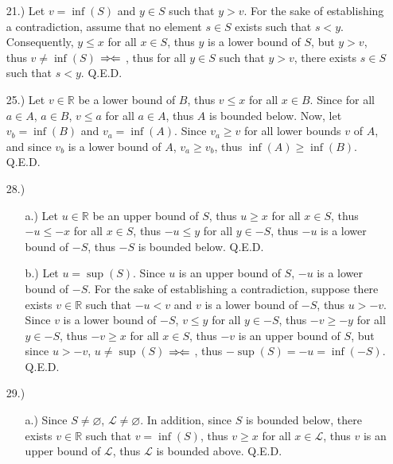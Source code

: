 \documentclass[12pt]{article}
\newcommand{\contradiction}{
    \ensuremath{{\Rightarrow\mspace{-2mu}\Leftarrow}}
}
\begin{document}
\pagestyle{fancy}
\fancyhead{}

\normalsize
\begin{itemize}

    \item [21.)] Let $v=\inf(S)$ and $y\in S$ such that $y>v$. For the sake of establishing a contradiction, assume that no element $s\in S$ exists such that $s<y$. Consequently, $y\leq x$ for all $x\in S$, thus $y$ is a lower bound of $S$, but $y>v$, thus $v\neq\inf(S)$\contradiction, thus for all $y\in S$ such that $y>v$, there exists $s\in S$ such that $s<y$. Q.E.D.

    \item [25.)] Let $v\in\mathbb{R}$ be a lower bound of $B$, thus $v\leq x$ for all $x\in B$. Since for all $a\in A$, $a\in B$, $v\leq a$ for all $a\in A$, thus $A$ is bounded below. Now, let $v_b=\inf(B)$ and $v_a=\inf(A)$. Since $v_a\geq v$ for all lower bounds $v$ of $A$, and since $v_b$ is a lower bound of $A$, $v_a\geq v_b$, thus $\inf(A)\geq\inf(B)$. Q.E.D.

    \item [28.)] \begin{itemize}
        \item [a.)] Let $u\in\mathbb{R}$ be an upper bound of $S$, thus $u\geq x$ for all $x\in S$, thus $-u\leq-x$ for all $x\in S$, thus $-u\leq y$ for all $y\in-S$, thus $-u$ is a lower bound of $-S$, thus $-S$ is bounded below. Q.E.D.

        \item [b.)] Let $u=\sup(S)$. Since $u$ is an upper bound of $S$, $-u$ is a lower bound of $-S$. For the sake of establishing a contradiction, suppose there exists $v\in\mathbb{R}$ such that $-u<v$ and $v$ is a lower bound of $-S$, thus $u>-v$. Since $v$ is a lower bound of $-S$, $v\leq y$ for all $y\in-S$, thus $-v\geq-y$ for all $y\in-S$, thus $-v\geq x$ for all $x\in S$, thus $-v$ is an upper bound of $S$, but since $u>-v$, $u\neq\sup(S)$\contradiction, thus $-\sup(S)=-u=\inf(-S)$. Q.E.D.
    \end{itemize}

    \item [29.)] \begin{itemize}
        \item [a.)] Since $S\neq\varnothing$, $\mathscr{L}\neq\varnothing$. In addition, since $S$ is bounded below, there exists $v\in\mathbb{R}$ such that $v=\inf(S)$, thus $v\geq x$ for all $x\in\mathscr{L}$, thus $v$ is an upper bound of $\mathscr{L}$, thus $\mathscr{L}$ is bounded above. Q.E.D.


\end{itemize}
\end{itemize}
\end{document}
